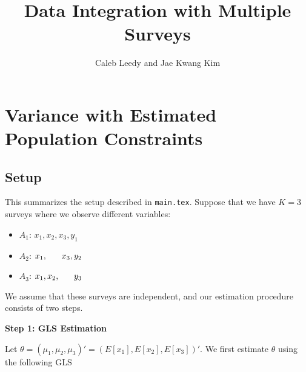 \documentclass[12pt]{article}
\begin{document}
\title{Data Integration with Multiple Surveys}
\author{Caleb Leedy and Jae Kwang Kim}
\maketitle 

\section*{Variance with Estimated Population Constraints}

\subsection*{Setup}

This summarizes the setup described in \texttt{main.tex}. Suppose that we have
$K = 3$ surveys where we observe different variables:

\begin{itemize}
  \item $A_1$: $x_1, x_2, x_3, y_1$
  \item $A_2$: $x_1, \hspace{0.6cm} x_3, y_2$
  \item $A_3$: $x_1, x_2, \hspace{0.6cm} y_3$
\end{itemize}

We assume that these surveys are independent, and our estimation procedure
consists of two steps.

\textbf{Step 1: GLS Estimation}

Let $\theta = (\mu_1, \mu_2, \mu_3)' = (E[x_1], E[x_2], E[x_3])'$. We first
estimate $\theta$ using the following GLS
\end{document}
